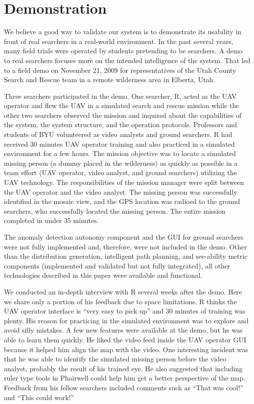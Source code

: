 \documentclass[letterpaper]{article}
\begin{document}
\section{Demonstration}

We believe a good way to validate our system is to demonstrate its usability in front of real searchers in a real-world environment. In the past several years, many field trials were operated by students pretending to be searchers. A demo to real searchers focuses more on the intended intelligence of the system. That led to a field demo on November 21, 2009 for representatives of the Utah County Search and Rescue team in a remote wilderness area in Elberta, Utah.

Three searchers participated in the demo. One searcher, R, acted as the UAV operator and flew the UAV in a simulated search and rescue mission while the other two searchers observed the mission and inquired about the capabilities of the system, the system structure, and the operation protocols. Professors and students of BYU volunteered as video analysts and ground searchers. R had received 30 minutes UAV operator training and also practiced in a simulated environment for a few hours. The mission objective was to locate a simulated missing person (a dummy placed in the wilderness) as quickly as possible in a team effort (UAV operator, video analyst, and ground searchers) utilizing the UAV technology. The responsibilities of the mission manager were split between the UAV operator and the video analyst. The missing person was successfully identified in the mosaic view, and the GPS location was radioed to the ground searchers, who successfully located the missing person. The entire mission completed in under 35 minutes.

The anomaly detection autonomy component and the GUI for ground searchers were not fully implemented and, therefore, were not included in the demo. Other than the distribution generation, intelligent path planning, and see-ability metric components (implemented and validated but not fully integrated), all other technologies described in this paper were available and functional.

We conducted an in-depth interview with R several weeks after the demo. Here we share only a portion of his feedback due to space limitations. R thinks the UAV operator interface is ``very easy to pick up'' and 30 minutes of training was plenty. His reason for practicing in the simulated environment was to explore and avoid silly mistakes. A few new features were available at the demo, but he was able to learn them quickly. He liked the video feed inside the UAV operator GUI because it helped him align the map with the video. One interesting incident was that he was able to identify the simulated missing person before the video analyst, probably the result of his trained eye. He also suggested that including ruler type tools in Phairwell could help him get a better perspective of the map. Feedback from his fellow searchers included comments such as ``That was cool!'' and ``This could work!''
\end{document}
